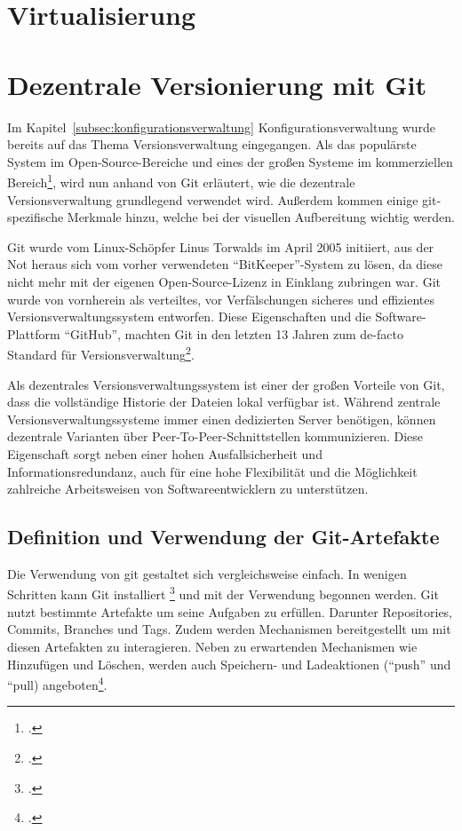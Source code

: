 \section{Virtualisierung}



\section{Dezentrale Versionierung mit Git}

Im Kapitel~\ref{subsec:konfigurationsverwaltung} Konfigurationsverwaltung wurde bereits auf das Thema Versionsverwaltung eingegangen. Als das populärste System im Open-Source-Bereiche und eines der großen Systeme im kommerziellen Bereich\footcite{g2crowd2018}, wird nun anhand von Git erläutert, wie die dezentrale Versionsverwaltung grundlegend verwendet wird. Außerdem kommen einige git-spezifische Merkmale hinzu, welche bei der visuellen Aufbereitung wichtig werden.

Git wurde vom Linux-Schöpfer Linus Torwalds im April 2005 initiiert, aus der Not heraus sich vom vorher verwendeten ``BitKeeper''-System zu lösen, da diese nicht mehr mit der eigenen Open-Source-Lizenz in Einklang zubringen war. Git wurde von vornherein als verteiltes, vor Verfälschungen sicheres und effizientes Versionsverwaltungssystem entworfen. Diese Eigenschaften und die Software-Plattform ``GitHub'', machten Git in den letzten 13 Jahren zum de-facto Standard für Versionsverwaltung\footcite{heise-torvald-git2015}.

Als dezentrales Versionsverwaltungssystem ist einer der großen Vorteile von Git, dass die vollständige Historie der Dateien lokal verfügbar ist. Während zentrale Versionsverwaltungssysteme immer einen dedizierten Server benötigen, können dezentrale Varianten über Peer-To-Peer-Schnittstellen kommunizieren. Diese Eigenschaft sorgt neben einer hohen Ausfallsicherheit und Informationsredundanz, auch für eine hohe Flexibilität und die Möglichkeit zahlreiche Arbeitsweisen von Softwareentwicklern zu unterstützen.

\subsection{Definition und Verwendung der Git-Artefakte}

Die Verwendung von git gestaltet sich vergleichsweise einfach. In wenigen Schritten kann Git installiert \footcite{git-scm-install} und mit der Verwendung begonnen werden. 
Git nutzt bestimmte Artefakte um seine Aufgaben zu erfüllen. Darunter Repositories, Commits, Branches und Tags. Zudem werden Mechanismen bereitgestellt um mit diesen Artefakten zu interagieren. Neben zu erwartenden Mechanismen wie Hinzufügen und Löschen, werden auch Speichern- und Ladeaktionen (``push'' und ``pull) angeboten\footcite{git-essentials-2017}.

